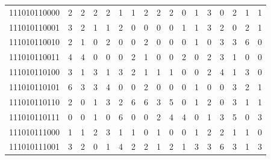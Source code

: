 \documentclass[10pt,a4paper]{article}
\begin{document}
\begin{longtable}{ |c|c|c|c|c|c|c|c|c|c|c|c|c|c|c|c|c| }
    111010110000              & 2                            & 2                                & 2                            & 2                              & 1   & 1   & 2   & 2   & 2   & 0   & 1   & 3   & 0   & 2   & 1   & 1   \\
    111010110001              & 3                            & 2                                & 1                            & 1                              & 2   & 0   & 0   & 0   & 0   & 1   & 1   & 3   & 2   & 0   & 2   & 1   \\
    111010110010              & 2                            & 1                                & 0                            & 2                              & 0   & 0   & 2   & 0   & 0   & 0   & 1   & 0   & 3   & 3   & 6   & 0   \\
    111010110011              & 4                            & 4                                & 0                            & 0                              & 0   & 2   & 1   & 0   & 0   & 2   & 0   & 2   & 3   & 1   & 0   & 0   \\
    111010110100              & 3                            & 1                                & 3                            & 1                              & 3   & 2   & 1   & 1   & 1   & 0   & 0   & 2   & 4   & 1   & 3   & 0   \\
    111010110101              & 6                            & 3                                & 3                            & 4                              & 0   & 0   & 2   & 0   & 0   & 0   & 1   & 0   & 0   & 3   & 2   & 1   \\
    111010110110              & 2                            & 0                                & 1                            & 3                              & 2   & 6   & 6   & 3   & 5   & 0   & 1   & 2   & 0   & 3   & 1   & 1   \\
    111010110111              & 0                            & 0                                & 1                            & 0                              & 6   & 0   & 0   & 2   & 4   & 4   & 0   & 1   & 3   & 5   & 0   & 3   \\
    111010111000              & 1                            & 1                                & 2                            & 3                              & 1   & 1   & 0   & 1   & 0   & 0   & 1   & 2   & 2   & 1   & 1   & 0   \\
    111010111001              & 3                            & 2                                & 0                            & 1                              & 4   & 2   & 2   & 1   & 2   & 1   & 3   & 3   & 6   & 3   & 1   & 3   \\

\end{longtable}
\end{document}
